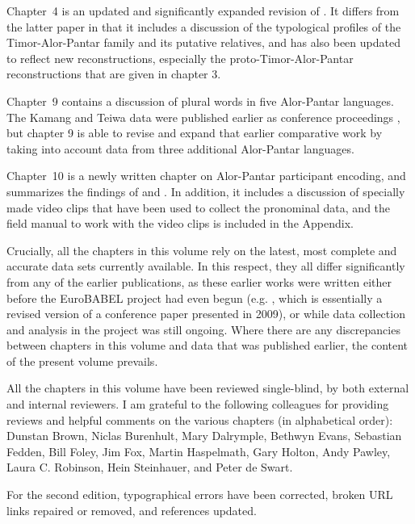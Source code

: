 \documentclass[output=paper]{LSP/langsci}
\begin{document}
Chapter~4 is an updated and significantly expanded revision of \citet{RobinsonEtAl2012reassessing}. It differs from the latter paper in that it includes a discussion of the typological profiles of the Timor-Alor-Pantar family and its putative relatives, and has also been updated to reflect new reconstructions, especially the proto-Timor-Alor-Pantar reconstructions that are given in chapter 3. 

Chapter~9 contains a discussion of plural words in five Alor-Pantar languages. The Kamang and Teiwa data were published earlier as conference proceedings \citep{SchapperEtAl2011plural}, but chapter 9 is able to revise and expand that earlier comparative work by taking into account data from three additional Alor-Pantar languages.

Chapter~10 is a newly written chapter on Alor-Pantar participant encoding, and summarizes the findings of \citet{FeddenEtAl2013} and \citet{FeddenEtAl2014}. In addition, it includes a discussion of specially made video clips that have been used to collect the pronominal data, and the field manual to work with the video clips is included in the Appendix.

Crucially, all the chapters in this volume rely on the latest, most complete and accurate data sets currently available. In this respect, they all differ significantly from any of the earlier publications, as these earlier works were written either before the EuroBABEL project had even begun (e.g. \citet{HoltonEtAl2012}, which is essentially a revised version of a conference paper presented in 2009), or while data collection and analysis in the project was still ongoing. Where there are any discrepancies between chapters in this volume and data that was published earlier, the content of the present volume prevails.

All the chapters in this volume have been reviewed single-blind, by both external and internal reviewers. I am grateful to the following colleagues for providing reviews and helpful comments on the various chapters (in alphabetical order): Dunstan Brown, Niclas Burenhult, Mary Dalrymple, Bethwyn Evans, Sebastian Fedden, Bill Foley, Jim Fox, Martin Haspelmath, Gary Holton, Andy Pawley, Laura C. Robinson, Hein Steinhauer, and Peter de Swart.

For the second edition, typographical errors have been corrected, broken URL links repaired or removed, and references updated.
	
\printbibliography[heading=subbibliography,notkeyword=this]
\end{document}
